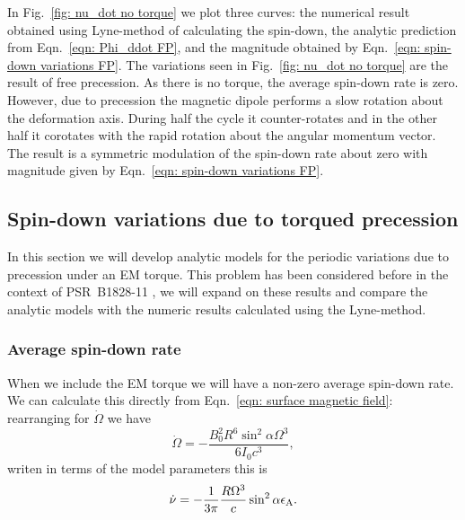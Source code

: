 \documentclass[../full_thesis/full_thesis.tex]{subfiles}
\begin{document}
In Fig.~\ref{fig: nu_dot no torque} we plot three curves: the numerical
result obtained using Lyne-method of calculating the spin-down, the analytic
prediction from Eqn.~\eqref{eqn: Phi_ddot FP}, and the magnitude obtained by
Eqn.~\eqref{eqn: spin-down variations FP}.
The variations seen in Fig.~\ref{fig: nu_dot no torque} are the result of
free precession. As there is no torque, the average spin-down rate is zero. However,
due to precession the magnetic dipole performs a slow rotation about the
deformation axis. During half the cycle it counter-rotates and in the other
half it corotates with the rapid rotation about the angular momentum vector.
The result is a symmetric modulation of the spin-down rate about zero with magnitude
given by Eqn.~\eqref{eqn: spin-down variations FP}.

\subsection{Spin-down variations due to torqued precession}
In this section we will develop analytic models for the periodic variations
due to precession under an EM torque. This problem has been considered before
in the context of PSR~B1828-11 \citep{Jones2001, Link2001, Akgun2006}, we will
expand on these results and compare the analytic models with the numeric
results calculated using the Lyne-method.

\subsubsection{Average spin-down rate}
When we include the EM torque we will have a non-zero average spin-down rate.
We can calculate this directly from Eqn.~\eqref{eqn: surface magnetic field}:
rearranging for $\dot{\Omega}$ we have
\begin{equation}
    \dot{\Omega} = -\frac{B_{0}^{2}R^{6} \sin^{2}\alpha \Omega^{3}}{6I_{0}c^{3}},
\end{equation}
writen in terms of the model parameters this is
\begin{equation}
\dot{\nu} = -\frac{1}{3\pi}\frac{R \Omega^{3}}{c} \sin^{2}\alpha \epsilon_{\mathrm{A}}.
\end{equation}
\end{document}
